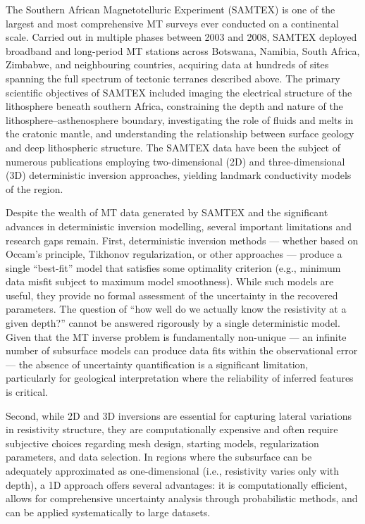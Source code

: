 The Southern African Magnetotelluric Experiment (SAMTEX) is one of the largest and most comprehensive MT surveys ever conducted on a continental scale. Carried out in multiple phases between 2003 and 2008, SAMTEX deployed broadband and long-period MT stations across Botswana, Namibia, South Africa, Zimbabwe, and neighbouring countries, acquiring data at hundreds of sites spanning the full spectrum of tectonic terranes described above. The primary scientific objectives of SAMTEX included imaging the electrical structure of the lithosphere beneath southern Africa, constraining the depth and nature of the lithosphere--asthenosphere boundary, investigating the role of fluids and melts in the cratonic mantle, and understanding the relationship between surface geology and deep lithospheric structure. The SAMTEX data have been the subject of numerous publications employing two-dimensional (2D) and three-dimensional (3D) deterministic inversion approaches, yielding landmark conductivity models of the region.

Despite the wealth of MT data generated by SAMTEX and the significant advances in deterministic inversion modelling, several important limitations and research gaps remain. First, deterministic inversion methods --- whether based on Occam's principle, Tikhonov regularization, or other approaches --- produce a single ``best-fit'' model that satisfies some optimality criterion (e.g., minimum data misfit subject to maximum model smoothness). While such models are useful, they provide no formal assessment of the uncertainty in the recovered parameters. The question of ``how well do we actually know the resistivity at a given depth?'' cannot be answered rigorously by a single deterministic model. Given that the MT inverse problem is fundamentally non-unique --- an infinite number of subsurface models can produce data fits within the observational error --- the absence of uncertainty quantification is a significant limitation, particularly for geological interpretation where the reliability of inferred features is critical.

Second, while 2D and 3D inversions are essential for capturing lateral variations in resistivity structure, they are computationally expensive and often require subjective choices regarding mesh design, starting models, regularization parameters, and data selection. In regions where the subsurface can be adequately approximated as one-dimensional (i.e., resistivity varies only with depth), a 1D approach offers several advantages: it is computationally efficient, allows for comprehensive uncertainty analysis through probabilistic methods, and can be applied systematically to large datasets.

